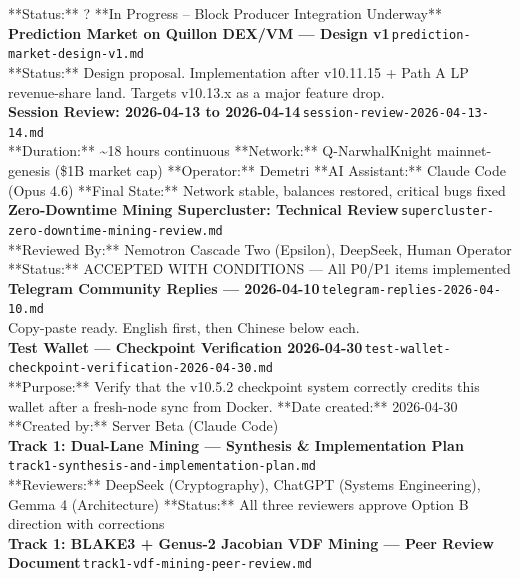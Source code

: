 \documentclass[11pt,a4paper]{article}
\begin{document}
**Status:** ? **In Progress -- Block Producer Integration Underway**\\[6pt]
\noindent\textbf{Prediction Market on Quillon DEX/VM --- Design v1}\,\textcolor{qgray}{\small \texttt{prediction-market-design-v1.md}}\\
**Status:** Design proposal. Implementation after v10.11.15 + Path A LP revenue-share land. Targets v10.13.x as a major feature drop.\\[6pt]
\noindent\textbf{Session Review: 2026-04-13 to 2026-04-14}\,\textcolor{qgray}{\small \texttt{session-review-2026-04-13-14.md}}\\
**Duration:** \textasciitilde{}18 hours continuous **Network:** Q-NarwhalKnight mainnet-genesis (\$1B market cap) **Operator:** Demetri **AI Assistant:** Claude Code (Opus 4.6) **Final State:** Network stable, balances restored, critical bugs fixed\\[6pt]
\noindent\textbf{Zero-Downtime Mining Supercluster: Technical Review}\,\textcolor{qgray}{\small \texttt{supercluster-zero-downtime-mining-review.md}}\\
**Reviewed By:** Nemotron Cascade Two (Epsilon), DeepSeek, Human Operator **Status:** ACCEPTED WITH CONDITIONS --- All P0/P1 items implemented\\[6pt]
\noindent\textbf{Telegram Community Replies --- 2026-04-10}\,\textcolor{qgray}{\small \texttt{telegram-replies-2026-04-10.md}}\\
Copy-paste ready. English first, then Chinese below each.\\[6pt]
\noindent\textbf{Test Wallet --- Checkpoint Verification 2026-04-30}\,\textcolor{qgray}{\small \texttt{test-wallet-checkpoint-verification-2026-04-30.md}}\\
**Purpose:** Verify that the v10.5.2 checkpoint system correctly credits this wallet after a fresh-node sync from Docker. **Date created:** 2026-04-30 **Created by:** Server Beta (Claude Code)\\[6pt]
\noindent\textbf{Track 1: Dual-Lane Mining --- Synthesis \& Implementation Plan}\,\textcolor{qgray}{\small \texttt{track1-synthesis-and-implementation-plan.md}}\\
**Reviewers:** DeepSeek (Cryptography), ChatGPT (Systems Engineering), Gemma 4 (Architecture) **Status:** All three reviewers approve Option B direction with corrections\\[6pt]
\noindent\textbf{Track 1: BLAKE3 + Genus-2 Jacobian VDF Mining --- Peer Review Document}\,\textcolor{qgray}{\small \texttt{track1-vdf-mining-peer-review.md}}\\
\end{document}
